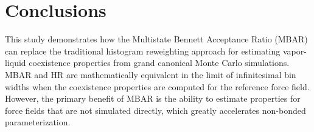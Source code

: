 \documentclass[journal=jced,manuscript=article]{achemso}
\begin{document}
%


%

\section{Conclusions} \label{sec: Conclusions}

This study demonstrates how the Multistate Bennett Acceptance Ratio (MBAR) can replace the traditional histogram reweighting approach for estimating vapor-liquid coexistence properties from grand canonical Monte Carlo simulations. MBAR and HR are mathematically equivalent in the limit of infinitesimal bin widths when the coexistence properties are computed for the reference force field. However, the primary benefit of MBAR is the ability to estimate properties for force fields that are not simulated directly, which greatly accelerates non-bonded parameterization.
\end{document}
